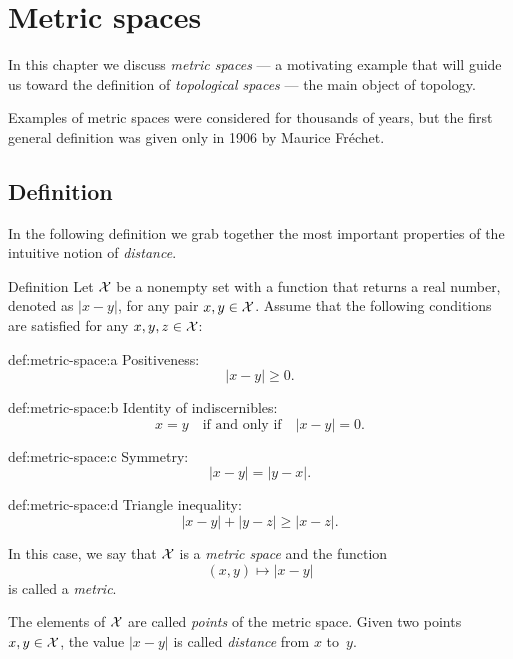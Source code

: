 \chapter{Metric spaces}

In this chapter we discuss \emph{metric spaces} --- 
a motivating example that will guide us toward the definition of \emph{topological spaces} --- the main object of topology.

Examples of metric spaces were considered for thousands of years,
but the first general definition was given only in 1906 by Maurice Fr\'echet.

\section{Definition}

In the following definition we grab together the most important properties of the intuitive notion of \emph{distance}.

\begin{thm}{Definition}\label{def:metric-space}
Let $\mathcal X$ be a nonempty set 
with a function 
that returns a real number, denoted as $|x-y|$,
for any pair $x,y\in\mathcal X$.
Assume that the following conditions are satisfied for any
$x,y,z\in \mathcal X$:

\begin{subthm}{def:metric-space:a}
Positiveness: 
$$|x-y|\ge 0.$$
\end{subthm}

\begin{subthm}{def:metric-space:b}
Identity of indiscernibles:  
$$x=y\quad\text{if and only if}\quad |x-y|=0.$$
\end{subthm}

\begin{subthm}{def:metric-space:c}
Symmetry: $$|x-y| = |y- x|.$$
\end{subthm}

\begin{subthm}{def:metric-space:d}
Triangle inequality: 
$$  |x- y| + |y- z| \ge |x-z|.$$
\end{subthm}

In this case, we say that $\mathcal X$ is a \emph{metric space} 
and the function 
\[(x,y)\mapsto |x-y|\] 
is called a \emph{metric}. 

The elements of $\mathcal X$ are called \emph{points} of the metric space.
Given two points $x,y\z\in \c X$, 
the value $|x-y|$ is called \emph{distance} from $x$ to~$y$.
\end{thm}

